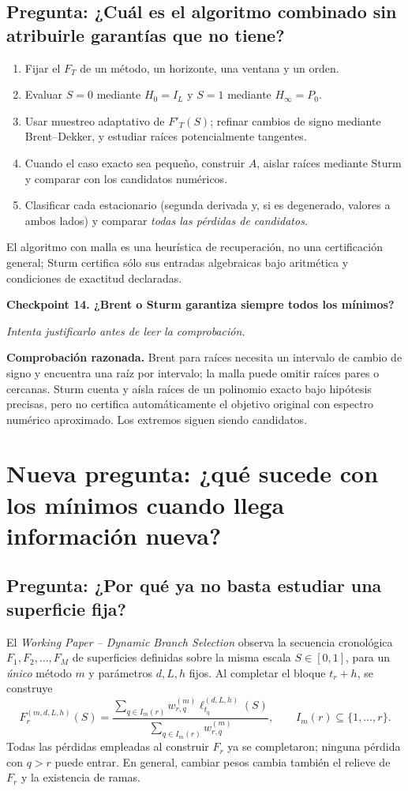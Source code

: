 \documentclass[11pt,letterpaper,parskip=half,headings=small]{scrartcl}
\theoremstyle{definition}\newtheorem{definicion}[proposicion]{Definición}
\theoremstyle{remark}\newtheorem{observacion}[proposicion]{Observación}
\newcommand{\pregunta}[1]{\subsection{Pregunta: #1}}
\newcommand{\checkpoint}[3]{%
  \par\medskip\noindent\textbf{\color{blue!45!black}Checkpoint #1. #2}\par
  \noindent\emph{Intenta justificarlo antes de leer la comprobación.}\par
  \noindent\textbf{Comprobación razonada. }#3\par\bigskip
}
\begin{document}
\pregunta{¿Cuál es el algoritmo combinado sin atribuirle garantías que no tiene?}
\begin{enumerate}[label=\arabic*.]
\item Fijar el $F_T$ de un método, un horizonte, una ventana y un orden.
\item Evaluar $S=0$ mediante $H_0=I_L$ y $S=1$ mediante $H_\infty=P_0$.
\item Usar muestreo adaptativo de $F'_T(S)$; refinar cambios de signo
      mediante Brent--Dekker, y estudiar raíces potencialmente tangentes.
\item Cuando el caso exacto sea pequeño, construir $A$, aislar raíces
      mediante Sturm y comparar con los candidatos numéricos.
\item Clasificar cada estacionario (segunda derivada y, si es degenerado,
      valores a ambos lados) y comparar \emph{todas las pérdidas de candidatos}.
\end{enumerate}
El algoritmo con malla es una heurística de recuperación, no una
certificación general; Sturm certifica sólo sus entradas algebraicas
bajo aritmética y condiciones de exactitud declaradas.

\checkpoint{14}{¿Brent o Sturm garantiza siempre todos los mínimos?}{Brent para raíces necesita un intervalo de cambio de signo y encuentra una raíz por intervalo; la malla puede omitir raíces pares o cercanas. Sturm cuenta y aísla raíces de un polinomio exacto bajo hipótesis precisas, pero no certifica automáticamente el objetivo original con espectro numérico aproximado. Los extremos siguen siendo candidatos.}

\section{Nueva pregunta: ¿qué sucede con los mínimos cuando llega información nueva?}
\pregunta{¿Por qué ya no basta estudiar una superficie fija?}
El \emph{Working Paper -- Dynamic Branch Selection} observa la secuencia
cronológica $F_1,F_2,\ldots,F_M$ de superficies definidas sobre la misma
escala $S\in[0,1]$, para un \emph{único} método $m$ y parámetros
$d,L,h$ fijos. Al completar el bloque $t_r+h$, se construye
\begin{equation}\label{eq:branchsurface}
F_r^{(m,d,L,h)}(S)=
\frac{\displaystyle\sum_{q\in I_m(r)}w_{r,q}^{(m)}\ell_{t_q}^{(d,L,h)}(S)}
{\displaystyle\sum_{q\in I_m(r)}w_{r,q}^{(m)}},
\qquad I_m(r)\subseteq\{1,\ldots,r\}.
\end{equation}
Todas las pérdidas empleadas al construir $F_r$ ya se completaron;
ninguna pérdida con $q>r$ puede entrar. En general, cambiar pesos
cambia también el relieve de $F_r$ y la existencia de ramas.
\end{document}
